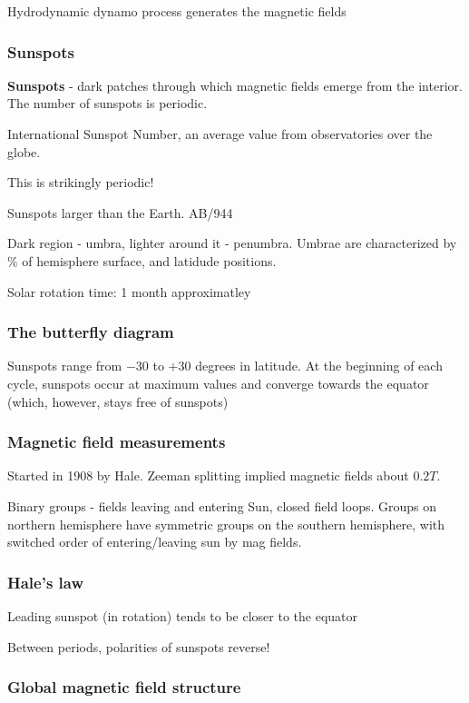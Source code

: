 \documentclass[PlasmaNotes.tex]{subfiles}
\begin{document}
Hydrodynamic dynamo process generates the magnetic fields

\subsubsection{Sunspots}

\textbf{Sunspots} - dark patches through which magnetic fields emerge from the interior. The number of sunspots is periodic.

International Sunspot Number, an average value from observatories over the globe.

This is strikingly periodic!

Sunspots larger than the Earth. AB/944

Dark region - umbra, lighter around it - penumbra. Umbrae are characterized by $\%$ of hemisphere surface, and latidude positions.

Solar rotation time: 1 month approximatley

\subsubsection{The butterfly diagram}

Sunspots range from $-30$ to $+30$ degrees in latitude. At the beginning of each cycle, sunspots occur at maximum values and converge towards the equator (which, however, stays free of sunspots)

\subsubsection{Magnetic field measurements}

Started in 1908 by Hale. Zeeman splitting implied magnetic fields about $ 0.2 T$.

Binary groups - fields leaving and entering Sun, closed field loops. Groups on northern hemisphere have symmetric groups on the southern hemisphere, with switched order of entering/leaving sun by mag fields.

\subsubsection{Hale's law}

Leading sunspot (in rotation) tends to be closer to the equator

Between periods, polarities of sunspots reverse!

\subsubsection{Global magnetic field structure}
\end{document}
